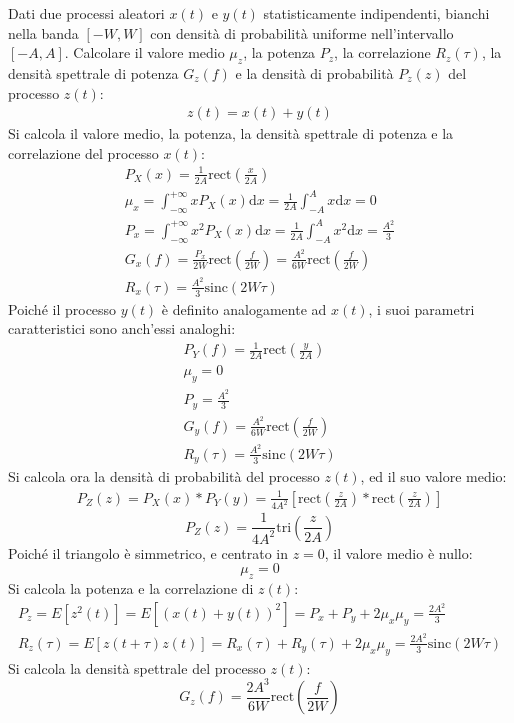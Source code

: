 \documentclass{article}
\newcommand{\intinf}{\displaystyle\int_{-\infty}^{+\infty}}
\newcommand{\rect}{\mathrm{rect}}
\newcommand{\sinc}{\mathrm{sinc}}
\newcommand{\tri}{\mathrm{tri}}
\newcommand{\df}{\mathrm{d}}
\begin{document}
Dati due processi aleatori $x(t)$ e $y(t)$ statisticamente indipendenti, bianchi nella banda $[-W,W]$ con densità di probabilità uniforme nell'intervallo $[-A,A]$. Calcolare il 
valore medio $\mu_z$, la potenza $P_z$, la correlazione $R_z(\tau)$, la densità spettrale di potenza $G_z(f)$ e la densità di probabilità $P_z(z)$ del 
processo $z(t)$:
\begin{gather*}
    z(t)=x(t)+y(t)
\end{gather*}
Si calcola il valore medio, la potenza, la densità spettrale di potenza e la correlazione del processo $x(t)$:
\begin{gather*}
    P_X(x)=\displaystyle\frac{1}{2A}\rect\left(\frac{x}{2A}\right)\\
    \mu_x=\intinf xP_X(x)\df x=\frac{1}{2A}\int_{-A}^Ax\df x=0\\
    P_x=\intinf x^2P_X(x)\df x=\frac{1}{2A}\int_{-A}^Ax^2\df x=\frac{A^2}{3}\\
    G_x(f)=\displaystyle\frac{P_x}{2W}\rect\left(\frac{f}{2W}\right)=\frac{A^2}{6W}\rect\left(\frac{f}{2W}\right)\\
    R_x(\tau)=\displaystyle\frac{A^2}{3}\sinc(2W\tau)
\end{gather*}
Poiché il processo $y(t)$ è definito analogamente ad $x(t)$, i suoi parametri caratteristici sono anch'essi analoghi:
\begin{gather*}
    P_Y(f)=\displaystyle\frac{1}{2A}\rect\left(\frac{y}{2A}\right)\\
    \mu_y=0\\
    P_y=\displaystyle\frac{A^2}{3}\\
    G_y(f)=\displaystyle\frac{A^2}{6W}\rect\left(\frac{f}{2W}\right)\\
    R_y(\tau)=\displaystyle\frac{A^2}{3}\sinc(2W\tau)
\end{gather*}
Si calcola ora la densità di probabilità del processo $z(t)$, ed il suo valore medio: 
\begin{gather*}
    P_Z(z)=P_X(x)*P_Y(y)=\frac{1}{4A^2}\left[\rect\left(\frac{z}{2A}\right)*\rect\left(\frac{z}{2A}\right)\right]
\end{gather*}
\begin{equation}
    P_Z(z)=\displaystyle\frac{1}{4A^2}\tri\left(\frac{z}{2A}\right)
\end{equation}
Poiché il triangolo è simmetrico, e centrato in $z=0$, il valore medio è nullo:
\begin{equation}
    \mu_z=0
\end{equation}
Si calcola la potenza e la correlazione di $z(t)$:
\begin{gather}
    P_z=E[z^2(t)]=E[(x(t)+y(t))^2]=P_x+P_y+2\mu_x\mu_y=\displaystyle\frac{2A^2}{3}\\
    R_z(\tau)=E[z(t+\tau)z(t)]=R_x(\tau)+R_y(\tau)+2\mu_x\mu_y=\displaystyle\frac{2A^2}{3}\sinc(2W\tau)
\end{gather}
Si calcola la densità spettrale del processo $z(t)$:
\begin{equation}
    G_z(f)=\displaystyle\frac{2A^3}{6W}\rect\left(\frac{f}{2W}\right)
\end{equation}
\end{document}
